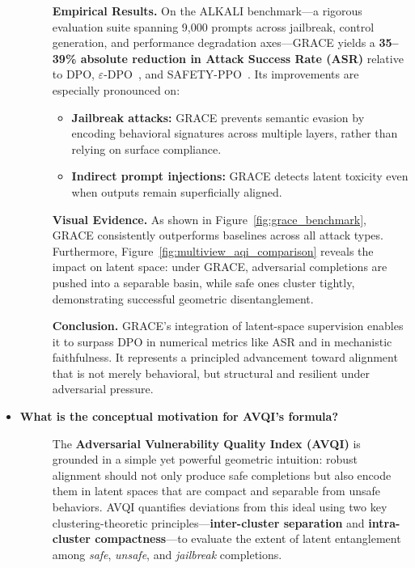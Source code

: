 \begin{itemize}[leftmargin=15pt,nolistsep]
\begin{description}
\textbf{Empirical Results.} On the {\fontsize{6}{7}\selectfont ALKALI} benchmark—a rigorous evaluation suite spanning 9,000 prompts across jailbreak, control generation, and performance degradation axes—GRACE yields a \textbf{35–39\% absolute reduction in Attack Success Rate (ASR)} relative to DPO, \(\varepsilon\)-DPO~\citep{wu2024generalized}, and SAFETY-PPO~\citep{park2023safety}. Its improvements are especially pronounced on:
\begin{itemize}[leftmargin=1.2em]
    \item \textbf{Jailbreak attacks:} GRACE prevents semantic evasion by encoding behavioral signatures across multiple layers, rather than relying on surface compliance.
    \item \textbf{Indirect prompt injections:} GRACE detects latent toxicity even when outputs remain superficially aligned.
\end{itemize}

\textbf{Visual Evidence.} As shown in Figure~\ref{fig:grace_benchmark}, GRACE consistently outperforms baselines across all attack types. Furthermore, Figure~\ref{fig:multiview_aqi_comparison} reveals the impact on latent space: under GRACE, adversarial completions are pushed into a separable basin, while safe ones cluster tightly, demonstrating successful geometric disentanglement.

\textbf{Conclusion.} GRACE's integration of latent-space supervision enables it to surpass DPO in numerical metrics like ASR and in mechanistic faithfulness. It represents a principled advancement toward alignment that is not merely behavioral, but structural and resilient under adversarial pressure.
\end{description}


\item[\ding{93}] { \selectfont \textbf{What is the conceptual motivation for AVQI’s formula?}}
\begin{description}
\item[]
The \textbf{Adversarial Vulnerability Quality Index (AVQI)} is grounded in a simple yet powerful geometric intuition: robust alignment should not only produce safe completions but also encode them in latent spaces that are compact and separable from unsafe behaviors. AVQI quantifies deviations from this ideal using two key clustering-theoretic principles—\textbf{inter-cluster separation} and \textbf{intra-cluster compactness}—to evaluate the extent of latent entanglement among \textit{safe}, \textit{unsafe}, and \textit{jailbreak} completions.


\end{description}
\end{itemize}
